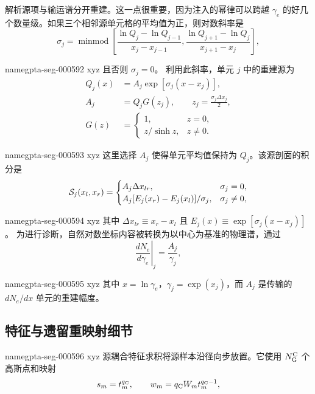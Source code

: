 \documentclass[twocolumn]{aastex702}
\makeatletter
\providecommand{\gptareaderanchor}[1]{\pdfdest name{#1} xyz}%
\providecommand{\gptareaderanchor}[1]{\special{pdf:dest (#1) [ @thispage /XYZ @xpos @ypos null ]}}%
\makeatother
\begin{document}
解析源项与输运谱分开重建。这一点很重要，因为注入的幂律可以跨越 \(\gamma_e\) 的好几个数量级。如果三个相邻源单元格的平均值为正，则对数斜率是
\begin{equation}
\sigma_j=\operatorname{minmod}\left[
\frac{\ln Q_j-\ln Q_{j-1}}{x_j-x_{j-1}},
\frac{\ln Q_{j+1}-\ln Q_j}{x_{j+1}-x_j}
\right],
\end{equation}

\gptareaderanchor{gpta-seg-000592}%
且否则 \(\sigma_j=0\)。 利用此斜率，单元 \(j\) 中的重建源为
\begin{equation}
\begin{aligned}
Q_j(x)&=A_j\exp[\sigma_j(x-x_j)],\\
A_j&=Q_jG(z_j),\qquad z_j=\frac{\sigma_j\Delta x_j}{2},\\
G(z)&=
\begin{cases}
1, & z=0,\\
z/\sinh z, & z\ne0.
\end{cases}
\end{aligned}
\end{equation}

\gptareaderanchor{gpta-seg-000593}%
这里选择 \(A_j\) 使得单元平均值保持为 \(Q_j\)。该源剖面的积分是
\begin{equation}
{\cal S}_j(x_l,x_r)=
\begin{cases}
A_j\Delta x_{lr}, & \sigma_j=0,\\
A_j[E_j(x_r)-E_j(x_l)]/\sigma_j, & \sigma_j\ne0,
\end{cases}
\end{equation}

\gptareaderanchor{gpta-seg-000594}%
其中 \(\Delta x_{lr}\equiv x_r-x_l\) 且 \(E_j(x)\equiv\exp[\sigma_j(x-x_j)]\)。
为进行诊断，自然对数坐标内容被转换为以中心为基准的物理谱，通过
\begin{equation}
\left.\frac{dN_e}{d\gamma_e}\right|_j
=\frac{A_j}{\gamma_j},
\end{equation}

\gptareaderanchor{gpta-seg-000595}%
其中 \(x=\ln\gamma_e\)，\(\gamma_j=\exp(x_j)\)，而 \(A_j\) 是传输的 \(dN_e/dx\) 单元的重建幅度。

\subsection{特征与遗留重映射细节}


\gptareaderanchor{gpta-seg-000596}%
源耦合特征求积将源样本沿径向步放置。它使用 \(N_{\rm G}^{\rm C}\) 个高斯点和映射
\begin{equation}
s_m=t_m^{q_{\rm C}},\qquad
w_m=q_{\rm C}W_mt_m^{q_{\rm C}-1},
\end{equation}
\end{document}
